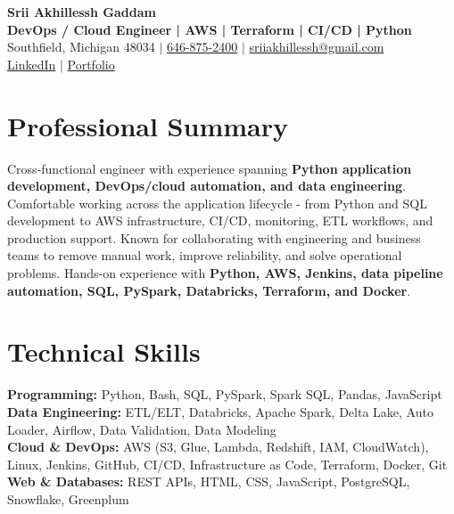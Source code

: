 \documentclass[letterpaper,10pt]{article}
\begin{document}
\fontsize{9.35pt}{10.45pt}\selectfont

\begin{center}
    {\LARGE \textbf{Srii Akhillessh Gaddam}} \\[-1pt]
    \textbf{DevOps / Cloud Engineer | AWS | Terraform | CI/CD | Python} \\[2pt]
    Southfield, Michigan 48034 $|$
    \href{tel:6468752400}{646-875-2400} $|$
    \href{mailto:sriiakhillessh@gmail.com}{sriiakhillessh@gmail.com} \\[1pt]
    \href{https://www.linkedin.com/in/srii-akhiilessh-gaddam-b48668191/}{LinkedIn} $|$
    \href{https://sriiakhillesshg.github.io/portfolio/}{Portfolio}
\end{center}
\vspace{-8pt}

\section{Professional Summary}
\small{Cross-functional engineer with experience spanning \textbf{Python application development, DevOps/cloud automation, and data engineering}. Comfortable working across the application lifecycle - from Python and SQL development to AWS infrastructure, CI/CD, monitoring, ETL workflows, and production support. Known for collaborating with engineering and business teams to remove manual work, improve reliability, and solve operational problems. Hands-on experience with \textbf{Python, AWS, Jenkins, data pipeline automation, SQL, PySpark, Databricks, Terraform, and Docker}.}

\section{Technical Skills}
\small{
\textbf{Programming:} Python, Bash, SQL, PySpark, Spark SQL, Pandas, JavaScript \\
\textbf{Data Engineering:} ETL/ELT, Databricks, Apache Spark, Delta Lake, Auto Loader, Airflow, Data Validation, Data Modeling \\
\textbf{Cloud \& DevOps:} AWS (S3, Glue, Lambda, Redshift, IAM, CloudWatch), Linux, Jenkins, GitHub, CI/CD, Infrastructure as Code, Terraform, Docker, Git \\
\textbf{Web \& Databases:} REST APIs, HTML, CSS, JavaScript, PostgreSQL, Snowflake, Greenplum
}
\end{document}
